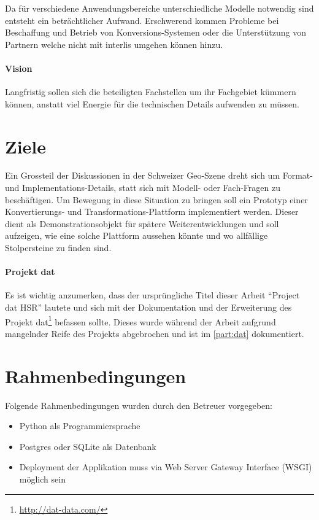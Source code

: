 Da für verschiedene Anwendungsbereiche unterschiedliche Modelle notwendig sind entsteht ein beträchtlicher Aufwand. Erschwerend kommen Probleme bei Beschaffung und Betrieb von Konversions-Systemen oder die Unterstützung von Partnern welche nicht mit \gls{interlis} umgehen können hinzu.

\paragraph{Vision}
Langfristig sollen sich die beteiligten Fachstellen um ihr Fachgebiet kümmern können, anstatt viel Energie für die technischen Details aufwenden zu müssen. 

\section{Ziele}
Ein Grossteil der Diskussionen in der Schweizer Geo-Szene dreht sich um Format- und Implementations-Details, statt sich mit Modell- oder Fach-Fragen zu beschäftigen. Um Bewegung in diese Situation zu bringen soll ein Prototyp einer Konvertierungs- und Transformations-Plattform implementiert werden. Dieser dient als Demonstrationsobjekt für spätere Weiterentwicklungen und soll aufzeigen, wie eine solche Plattform aussehen könnte und wo allfällige Stolpersteine zu finden sind.

\paragraph{Projekt dat}
Es ist wichtig anzumerken, dass der ursprüngliche Titel dieser Arbeit ``Project dat HSR'' lautete und sich mit der Dokumentation und der Erweiterung des Projekt dat\footnote{\url{http://dat-data.com/}} befassen sollte. Dieses wurde während der Arbeit aufgrund mangelnder Reife des Projekts abgebrochen und ist im \vref{part:dat} dokumentiert.

\section{Rahmenbedingungen}

Folgende Rahmenbedingungen wurden durch den Betreuer\cite{sfkeller} vorgegeben:

\begin{itemize}
\item Python als Programmiersprache
\item Postgres oder SQLite als Datenbank
\item Deployment der Applikation muss via Web Server Gateway Interface (WSGI) möglich sein
\end{itemize}

